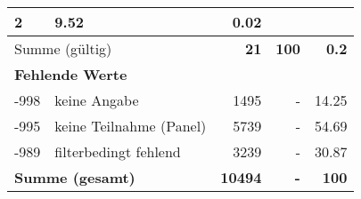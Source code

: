 \begin{longtable}{lXrrr}
       \num{2} &
       \num[round-mode=places,round-precision=2]{9,52} &
         \num[round-mode=places,round-precision=2]{0,02} \\
     \midrule
     \multicolumn{2}{l}{Summe (gültig)} &
       \textbf{\num{21}} &
     \textbf{100} &
       \textbf{\num[round-mode=places,round-precision=2]{0,2}} \\
     \multicolumn{5}{l}{\textbf{Fehlende Werte}}\\
       -998 &
       keine Angabe &
         \num{1495} &
        - &
         \num[round-mode=places,round-precision=2]{14,25} \\
       -995 &
       keine Teilnahme (Panel) &
         \num{5739} &
        - &
         \num[round-mode=places,round-precision=2]{54,69} \\
       -989 &
       filterbedingt fehlend &
         \num{3239} &
        - &
         \num[round-mode=places,round-precision=2]{30,87} \\
     \midrule
     \multicolumn{2}{l}{\textbf{Summe (gesamt)}} &
          \textbf{\num{10494}} &
        \textbf{-} &
        \textbf{100} \\
     \bottomrule
     \end{longtable}
     
